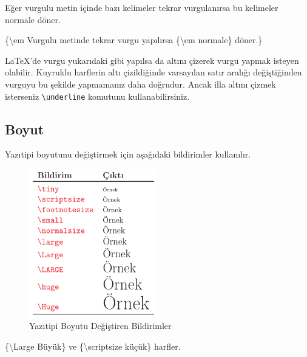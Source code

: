\documentclass[
  10pt,
]{scrbook}
\newenvironment{Shaded}{\begin{snugshade}}{\end{snugshade}}
\newcommand{\FunctionTok}[1]{\textcolor[rgb]{0.00,0.00,0.00}{#1}}
\newcommand{\NormalTok}[1]{#1}
\theoremstyle{definition}
\theoremstyle{definition}
\theoremstyle{definition}
\theoremstyle{definition}
\theoremstyle{remark}
\begin{document}
Eğer vurgulu metin içinde bazı kelimeler tekrar vurgulanırsa bu kelimeler normale döner.

\begin{Shaded}
\begin{Highlighting}[]
\NormalTok{\{}\FunctionTok{\textbackslash{}em}\NormalTok{ Vurgulu metinde tekrar}
\NormalTok{vurgu yapılırsa \{}\FunctionTok{\textbackslash{}em}\NormalTok{ normale\}}
\NormalTok{döner.\}}
\end{Highlighting}
\end{Shaded}

LaTeX'de vurgu yukarıdaki gibi yapılsa da altını çizerek vurgu yapmak isteyen olabilir. Kuyruklu harflerin altı çizildiğinde varsayılan satır aralığı değiştiğinden vurguyu bu şekilde yapmamanız daha doğrudur. Ancak illa altını çizmek isterseniz \texttt{\textbackslash{}underline} komutunu kullanabilirsiniz.

\hypertarget{boyut}{%
\subsection{Boyut}\label{boyut}}

Yazıtipi boyutunu değiştirmek için aşağıdaki bildirimler kullanılır.

\begin{figure}
\centering
\includegraphics[width=0.5\textwidth,height=\textheight]{images/yazitipi8.png}
\caption{Yazıtipi Boyutu Değiştiren Bildirimler}
\end{figure}

\begin{Shaded}
\begin{Highlighting}[]
\NormalTok{\{}\FunctionTok{\textbackslash{}Large}\NormalTok{ Büyük\} ve}
\NormalTok{\{}\FunctionTok{\textbackslash{}scriptsize}\NormalTok{ küçük\} harfler.}
\end{Highlighting}
\end{Shaded}
\end{document}

